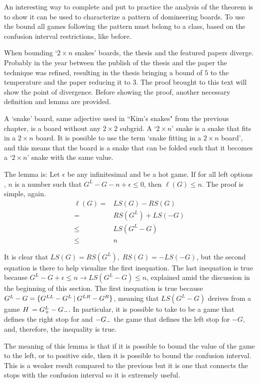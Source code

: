 An interesting way to complete and put to practice the analysis of the theorem is to show it can be used to characterize a pattern of domineering boards. To use the bound all games following the pattern must belong to a class, based on the confusion interval restrictions, like before.

When bounding `$2\times n$ snakes' boards, the thesis and the featured papers diverge. Probably in the year between the publish of the thesis and the paper the technique was refined, resulting in the thesis bringing a bound of $5$ to the temperature and the paper reducing it to $3$. The proof brought to this text will show the point of divergence. Before showing the proof, another necessary definition and lemma are provided.

A `snake' board, same adjective used in ``Kim's snakes" from the previous chapter, is a board without any $2\times 2$ subgrid. A `$2\times n$' snake is a snake that fits in a $2\times n$ board. It is possible to use the term `snake fitting in a $2\times n$ board', and this means that the board is a snake that can be folded such that it becomes a `$2\times n$' snake with the same value.

The lemma is: Let $\epsilon$ be any infinitesimal and \Gm{} be a hot game. If for all left options , $n$ is a number such that $G^L - G - n +\epsilon \leq 0$, then $\ell(G) \leq n$. The proof is simple, again.
\begin{align*}
	\ell(G) =& LS(G) - RS(G) \\
	=& RS(G^L) + LS(-G) \\
	\leq& LS(G^L - G) \\
	\leq& n
\end{align*}

It is clear that $LS(G) = RS(G^L),\; RS(G) = - LS(-G)$, but the second equation is there to help visualize the first inequation. The last inequation is true because $G^L - G + \epsilon \leq n \longrightarrow LS(G^L-G)\leq n$, explained amid the discussion in the beginning of this section. The first inequation is true because $G^L - G = \mbox{$\{G^{LL}-G^L\:|\:G^{LR}-G^R\}$}$, meaning that $LS(G^L-G)$ derives from a game $\mbox{$H\,$} = \mbox{$G^L_+$} - \mbox{$G_-$}$. In particular, it is possible to take  to be a game that defines the right stop for  and $-\mbox{$G_-$}$ the game that defines the left stop for $-G$, and, therefore, the inequality is true.

The meaning of this lemma is that if it is possible to bound the value of the game to the left, or to positive side, then it is possible to bound the confusion interval. This is a weaker result compared to the previous but it is one that connects the stops with the confusion interval so it is extremely useful.

